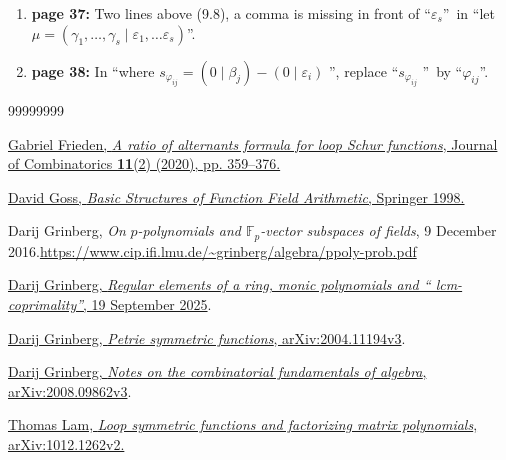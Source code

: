 \documentclass[numbers=enddot,12pt,final,onecolumn,notitlepage]{scrartcl}%
\theoremstyle{definition}
\begin{document}
\begin{enumerate}
\item \textbf{page 37:} Two lines above (9.8), a comma is missing in front of
\textquotedblleft$\varepsilon_{s}$\textquotedblright\ in \textquotedblleft let
$\mu=\left(  \gamma_{1},\ldots,\gamma_{s}\mid\varepsilon_{1},\ldots
\varepsilon_{s}\right)  $\textquotedblright.

\item \textbf{page 38:} In \textquotedblleft where $s_{\varphi_{ij}}=\left(
0\mid\beta_{j}\right)  -\left(  0\mid\varepsilon_{i}\right)  $%
\textquotedblright, replace \textquotedblleft$s_{\varphi_{ij}}$%
\textquotedblright\ by \textquotedblleft$\varphi_{ij}$\textquotedblright.
\end{enumerate}

\begin{thebibliography}{99999999}                                                                                         %


%
\href{https://doi.org/10.4310/joc.2020.v11.n2.a7}{Gabriel Frieden, \textit{A
ratio of alternants formula for loop Schur functions}, Journal of
Combinatorics \textbf{11}(2) (2020), pp. 359--376.}

\href{https://doi.org/10.1007/978-3-642-61480-4}{David
Goss, \textit{Basic Structures of Function Field Arithmetic}, Springer 1998.}

Darij Grinberg, \textit{On }$p$\textit{-polynomials
and $\mathbb{F}_{p}$-vector subspaces of fields}, 9 December 2016.\newline\url{https://www.cip.ifi.lmu.de/~grinberg/algebra/ppoly-prob.pdf}

%
\href{https://www.cip.ifi.lmu.de/~grinberg/algebra/regpol.pdf}{Darij Grinberg,
\textit{Regular elements of a ring, monic polynomials and \textquotedblleft
lcm-coprimality\textquotedblright}, 19 September 2025}.

\href{https://arxiv.org/abs/2004.11194v3}{Darij
Grinberg, \textit{Petrie symmetric functions}, arXiv:2004.11194v3}.

\href{https://arxiv.org/abs/2008.09862v3}{Darij
Grinberg, \textit{Notes on the combinatorial fundamentals of algebra},
arXiv:2008.09862v3}.

\href{https://arxiv.org/abs/1012.1262v2}{Thomas Lam,
\textit{Loop symmetric functions and factorizing matrix polynomials},
arXiv:1012.1262v2.}


\end{thebibliography}
\end{document}

